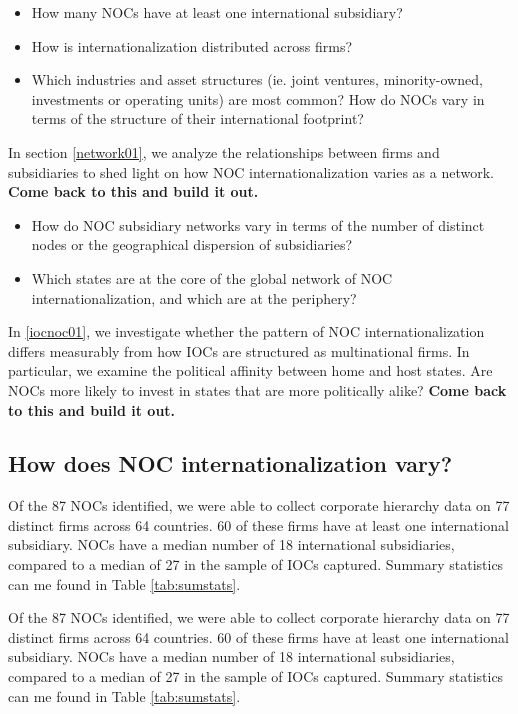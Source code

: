 \documentclass[11pt,]{book}
\providecommand{\tightlist}{%
  \setlength{\itemsep}{0pt}\setlength{\parskip}{0pt}}
\begin{document}
\begin{itemize}
\tightlist
\item
  How many NOCs have at least one international subsidiary?
\item
  How is internationalization distributed across firms?
\item
  Which industries and asset structures (ie. joint ventures, minority-owned, investments or operating units) are most common? How do NOCs vary in terms of the structure of their international footprint?
\end{itemize}

In section \ref{network01}, we analyze the relationships between firms and subsidiaries to shed light on how NOC internationalization varies as a network. \textbf{Come back to this and build it out.}

\begin{itemize}
\tightlist
\item
  How do NOC subsidiary networks vary in terms of the number of distinct nodes or the geographical dispersion of subsidiaries?
\item
  Which states are at the core of the global network of NOC internationalization, and which are at the periphery?
\end{itemize}

In \ref{iocnoc01}, we investigate whether the pattern of NOC internationalization differs measurably from how IOCs are structured as multinational firms. In particular, we examine the political affinity between home and host states. Are NOCs more likely to invest in states that are more politically alike? \textbf{Come back to this and build it out.}

\hypertarget{descriptivestats01}{%
\subsection{How does NOC internationalization vary?}\label{descriptivestats01}}

Of the 87 NOCs identified, we were able to collect corporate hierarchy data on 77 distinct firms across 64 countries. 60 of these firms have at least one international subsidiary. NOCs have a median number of 18 international subsidiaries, compared to a median of 27 in the sample of IOCs captured. Summary statistics can me found in Table \ref{tab:sumstats}.

Of the 87 NOCs identified, we were able to collect corporate hierarchy data on 77 distinct firms across 64 countries. 60 of these firms have at least one international subsidiary. NOCs have a median number of 18 international subsidiaries, compared to a median of 27 in the sample of IOCs captured. Summary statistics can me found in Table \ref{tab:sumstats}.
\end{document}
